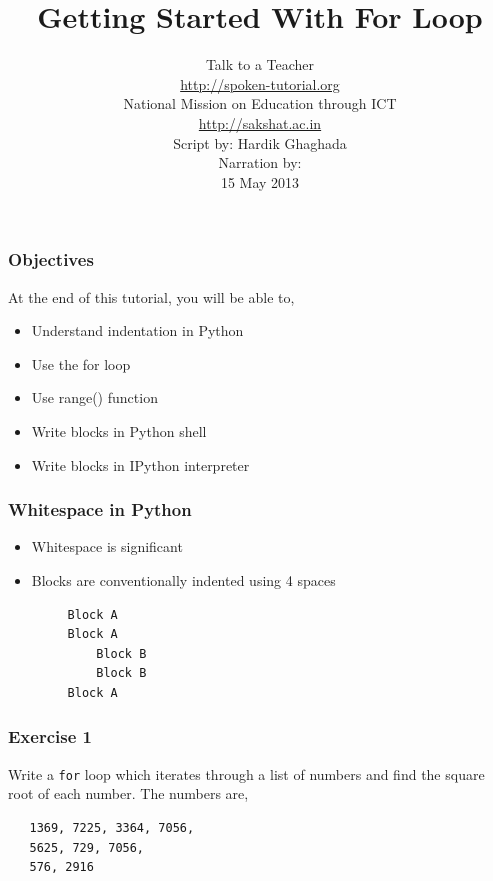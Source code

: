 \documentclass[17pt]{beamer}
\author[FOSSEE]{}
\institute[IIT Bombay]{}
\date[]{}
\begin{document}
\sffamily \bfseries
\title
[Getting Started With For Loop]
{Getting Started With For Loop}
\author
[FOSSEE, IIT - Bombay]
{\small Talk to a Teacher\\{\color{blue}\url{http://spoken-tutorial.org}}\\National Mission on Education
 through ICT\\{\color{blue}\url{http://sakshat.ac.in}} \\ [0.8cm]Script by: Hardik Ghaghada \\ Narration by: \\
 [0.5cm]
{\small 15 May 2013}}

\begin{frame}
  \titlepage
\end{frame}
\begin{frame}
\frametitle{Objectives}
  At the end of this tutorial, you will be able to, 
\begin{itemize}
\item Understand indentation in Python
\item Use the for loop
\item Use range() function
\item Write blocks in Python shell
\item Write blocks in IPython interpreter
\end{itemize}
\end{frame}
\begin{frame}[fragile]
\frametitle{Whitespace in Python}
\begin{itemize}
\item Whitespace is significant
\item Blocks are conventionally indented using 4 spaces
\begin{verbatim}
     Block A
     Block A
         Block B
         Block B
     Block A
\end{verbatim}
\end{itemize}
\end{frame}
\begin{frame}[fragile]
\frametitle{Exercise 1}
  Write a \verb~for~ loop which iterates through a list of numbers and find
  the square root of each number.
  The numbers are,
\begin{verbatim}
   1369, 7225, 3364, 7056,
   5625, 729, 7056, 
   576, 2916
\end{verbatim}
\end{frame}
\end{document}
